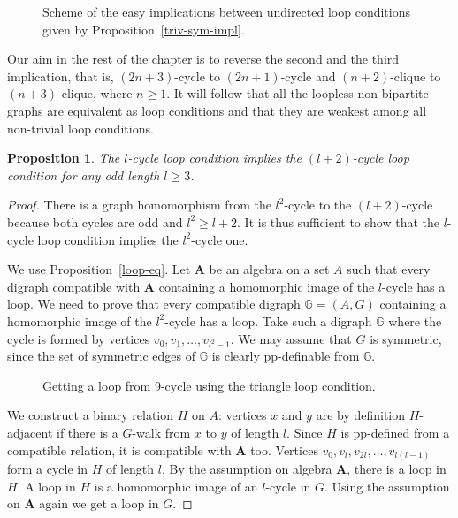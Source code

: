 \documentclass[a4paper]{article}
\def\inkpict#1#2#3{\medskip
\begin{figure}[!ht]
  \def\svgwidth{#1}
  \centering
     
  \caption{#3}
\end{figure}
}
\newcommand{\alg}[1]{\mathbf{#1}}
\newcommand{\relstr}[1]{\mathbb{#1}}
\newtheorem{proposition}{Proposition}
\begin{document}
\inkpict{10cm}{gen-unorient}{Scheme of the easy implications between
  undirected loop conditions given by Proposition~\ref{triv-sym-impl}.}

Our aim in the rest of the chapter is to reverse the second and the third implication, that is,
$(2n+3)$-cycle to $(2n+1)$-cycle and $(n+2)$-clique to $(n+3)$-clique,
where $n\geq 1$. It will follow that all the loopless
non-bipartite graphs are equivalent as loop conditions and that they
are weakest among all non-trivial loop conditions.

\begin{proposition}
\label{larger_cycles}
The $l$-cycle loop condition implies the $(l+2)$-cycle loop
condition for any odd length $l\geq 3$.
\end{proposition}
\begin{proof}
There is a graph homomorphism from the
$l^2$-cycle to the $(l+2)$-cycle because both cycles are odd and
$l^2\geq l+2$.
It is thus sufficient to show that the $l$-cycle loop condition
implies the $l^2$-cycle one.

We use Proposition~\ref{loop-eq}. Let $\alg A$ be an
algebra on a set $A$ such that every digraph compatible with $\alg A$ containing a
homomorphic image of the $l$-cycle has a loop. We need to prove that every
compatible digraph $\relstr G=(A, G)$ containing a homomorphic image of the
$l^2$-cycle has a loop. Take such a digraph $\relstr G$ where the cycle is
formed by vertices $v_0, v_1, \ldots, v_{l^2-1}$. We may assume that $G$ is symmetric, since the set of symmetric edges of $\relstr{G}$ is clearly pp-definable from $\relstr G$.

\inkpict{8cm}{9-cycle}{Getting a loop from 9-cycle using the triangle
  loop condition.}

We construct a binary relation $H$ on $A$: vertices $x$ and $y$ are by
definition $H$-adjacent if there is a $G$-walk from $x$ to $y$ of
length $l$. Since $H$ is pp-defined from a compatible relation, it is
compatible with $\alg A$ too.
Vertices $v_0, v_l, v_{2l}, \ldots, v_{l(l-1)}$ form a
cycle in $H$ of length $l$. By the assumption on algebra $\alg A$,
there is a loop in $H$. A loop in $H$ is a homomorphic image of an
$l$-cycle in $G$. Using the assumption on $\alg A$ again we
get a loop in $G$.
\end{proof}
\end{document}
